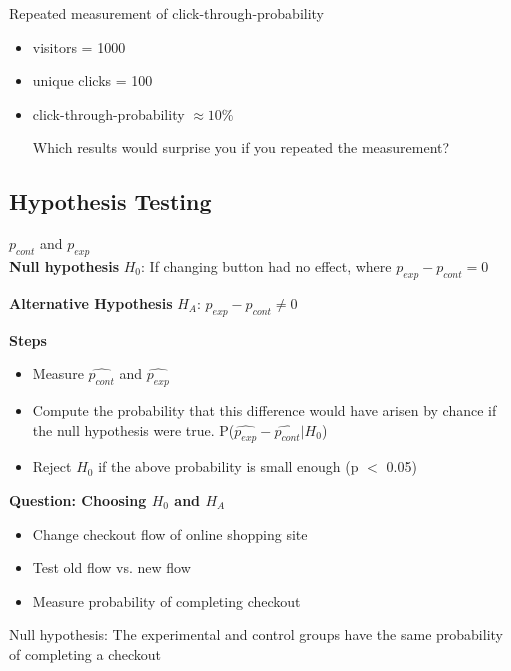 \documentclass[10pt]{article}
\theoremstyle{definition}
\begin{document}
Repeated measurement of click-through-probability
\begin{itemize}
    \item visitors = 1000
    \item unique clicks = 100
    \item click-through-probability $\approx 10\%$
    
    Which results would surprise you if you repeated the measurement?
\end{itemize}

\subsection{Hypothesis Testing}

$p_{cont}$ and $p_{exp}$ \\

\textbf{Null hypothesis} $H_{0}$: If changing button had no effect, where $p_{exp} - p_{cont} = 0$

\textbf{Alternative Hypothesis} $H_{A}$: $p_{exp} - p_{cont} \neq 0$

\textbf{Steps}

\begin{itemize}
\item Measure $\hat{p_{cont}}$ and $\hat{p_{exp}}$
\item Compute the probability that this difference would have arisen by chance if the null hypothesis were true. P($\hat{p_{exp}} - \hat{p_{cont}}|H_{0}$)
\item Reject $H_{0}$ if the above probability is small enough (p $<$ 0.05)
\end{itemize}

\textbf{Question: Choosing $H_{0}$ and $H_{A}$}
\begin{itemize}
    \item Change checkout flow of online shopping site
    \item Test old flow vs. new flow
    \item Measure probability of completing checkout
\end{itemize}
Null hypothesis: The experimental and control groups have the same probability of completing a checkout
\end{document}
